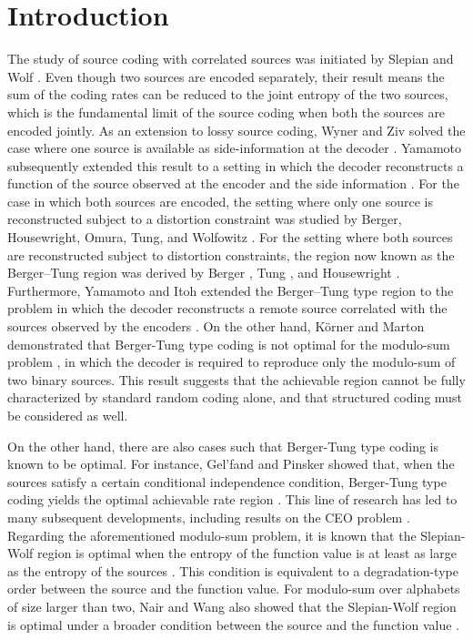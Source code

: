 \documentclass[journal,onecolumn]{IEEEtran}
\theoremstyle{definition}
\theoremstyle{remark}
\begin{document}
\section{Introduction}
The study of source coding with correlated sources was initiated by 
Slepian and Wolf \cite{slepian:73}. Even though two sources are encoded separately, their result means
the sum of the coding rates can be reduced to the joint entropy of the two sources, which is the fundamental 
limit of the source coding when both the sources are encoded jointly. 
As an extension to lossy source coding, Wyner and Ziv solved the case where one source is available as 
side-information at the decoder \cite{wyner:76}. 
Yamamoto subsequently extended this result to a setting in which the decoder reconstructs a function of the source observed at the encoder and the side information \cite{yamamoto:82}.
For the case in which both sources are encoded, the setting where only one source is reconstructed subject to a distortion constraint was studied by Berger, Housewright, Omura, Tung, and Wolfowitz \cite{BergerHousewright:79}.
For the setting where both sources are reconstructed subject to distortion constraints, the region now known as the Berger–Tung region was derived by Berger \cite{berger:78}, Tung \cite{tung:78}, and Housewright \cite{Housewright:77}.
Furthermore, Yamamoto and Itoh extended the Berger–Tung type region to the problem in which the decoder reconstructs a remote source correlated with the sources observed by the encoders \cite{YamamotoItoh:1980}.
On the other hand, K\"orner and Marton demonstrated that Berger-Tung type coding is not optimal for the 
modulo-sum problem \cite{KM}, in which the decoder is required to reproduce only the modulo-sum of two binary sources. 
This result suggests that the achievable region cannot be fully characterized by standard random coding alone,
and that structured coding must be considered as well. 


On the other hand, there are also cases such that Berger-Tung type coding is known
to be optimal. For instance, Gel'fand and Pinsker showed that, when 
the sources satisfy a certain conditional independence condition, Berger-Tung type coding yields the 
optimal achievable rate region \cite{GelPin:79}. This line of research has led to many subsequent developments, including
results on the CEO problem \cite{berger:96,viswanathan:97,oohama:98,oohama:05,PraTseRam:04,wagner:08,wagner:08b,Oohama:06b,oohama:09b,TavVisWag:10,SefTch:16}. 
Regarding the aforementioned modulo-sum problem,
it is known that the Slepian-Wolf region is optimal when the entropy of the function value is at least as large
as the entropy of the sources \cite[Ex 16.23]{Csiszár_Körner_2011}. This condition is equivalent to a degradation-type order between the source
and the function value. For modulo-sum over alphabets of size larger than two, Nair and Wang also showed that
the Slepian-Wolf region is optimal under a broader condition between the source and the function value \cite{Nair}.
\end{document}
